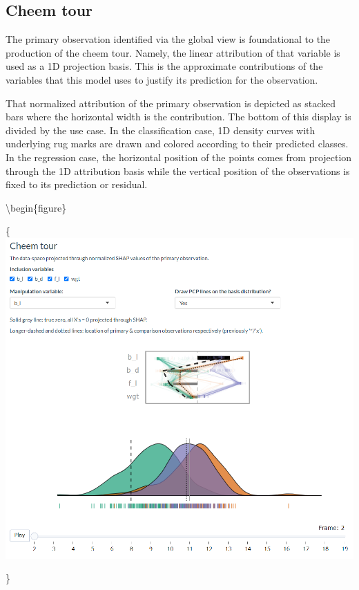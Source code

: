 \documentclass[
]{article}
\begin{document}
\hypertarget{cheem-tour}{%
\subsection{Cheem tour}\label{cheem-tour}}

The primary observation identified via the global view is foundational to the production of the cheem tour. Namely, the linear attribution of that variable is used as a 1D projection basis. This is the approximate contributions of the variables that this model uses to justify its prediction for the observation.

That normalized attribution of the primary observation is depicted as stacked bars where the horizontal width is the contribution. The bottom of this display is divided by the use case. In the classification case, 1D density curves with underlying rug marks are drawn and colored according to their predicted classes. In the regression case, the horizontal position of the points comes from projection through the 1D attribution basis while the vertical position of the observations is fixed to its prediction or residual.

\textbackslash begin\{figure\}

\{\centering \includegraphics[width=1\linewidth]{./figures/cheem_tour_penguins}

\}
\end{document}
